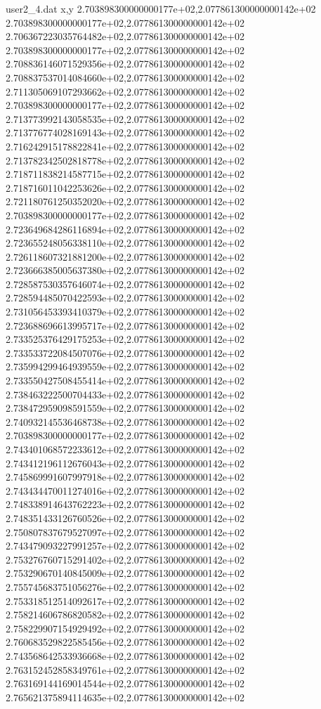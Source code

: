 \begin{filecontents}{user2_4.dat}
x,y
2.703898300000000177e+02,2.077861300000000142e+02
2.703898300000000177e+02,2.077861300000000142e+02
2.706367223035764482e+02,2.077861300000000142e+02
2.703898300000000177e+02,2.077861300000000142e+02
2.708836146071529356e+02,2.077861300000000142e+02
2.708837537014084660e+02,2.077861300000000142e+02
2.711305069107293662e+02,2.077861300000000142e+02
2.703898300000000177e+02,2.077861300000000142e+02
2.713773992143058535e+02,2.077861300000000142e+02
2.713776774028169143e+02,2.077861300000000142e+02
2.716242915178822841e+02,2.077861300000000142e+02
2.713782342502818778e+02,2.077861300000000142e+02
2.718711838214587715e+02,2.077861300000000142e+02
2.718716011042253626e+02,2.077861300000000142e+02
2.721180761250352020e+02,2.077861300000000142e+02
2.703898300000000177e+02,2.077861300000000142e+02
2.723649684286116894e+02,2.077861300000000142e+02
2.723655248056338110e+02,2.077861300000000142e+02
2.726118607321881200e+02,2.077861300000000142e+02
2.723666385005637380e+02,2.077861300000000142e+02
2.728587530357646074e+02,2.077861300000000142e+02
2.728594485070422593e+02,2.077861300000000142e+02
2.731056453393410379e+02,2.077861300000000142e+02
2.723688696613995717e+02,2.077861300000000142e+02
2.733525376429175253e+02,2.077861300000000142e+02
2.733533722084507076e+02,2.077861300000000142e+02
2.735994299464939559e+02,2.077861300000000142e+02
2.733550427508455414e+02,2.077861300000000142e+02
2.738463222500704433e+02,2.077861300000000142e+02
2.738472959098591559e+02,2.077861300000000142e+02
2.740932145536468738e+02,2.077861300000000142e+02
2.703898300000000177e+02,2.077861300000000142e+02
2.743401068572233612e+02,2.077861300000000142e+02
2.743412196112676043e+02,2.077861300000000142e+02
2.745869991607997918e+02,2.077861300000000142e+02
2.743434470011274016e+02,2.077861300000000142e+02
2.748338914643762223e+02,2.077861300000000142e+02
2.748351433126760526e+02,2.077861300000000142e+02
2.750807837679527097e+02,2.077861300000000142e+02
2.743479093227991257e+02,2.077861300000000142e+02
2.753276760715291402e+02,2.077861300000000142e+02
2.753290670140845009e+02,2.077861300000000142e+02
2.755745683751056276e+02,2.077861300000000142e+02
2.753318512514092617e+02,2.077861300000000142e+02
2.758214606786820582e+02,2.077861300000000142e+02
2.758229907154929492e+02,2.077861300000000142e+02
2.760683529822585456e+02,2.077861300000000142e+02
2.743568642533936668e+02,2.077861300000000142e+02
2.763152452858349761e+02,2.077861300000000142e+02
2.763169144169014544e+02,2.077861300000000142e+02
2.765621375894114635e+02,2.077861300000000142e+02

\end{filecontents}
